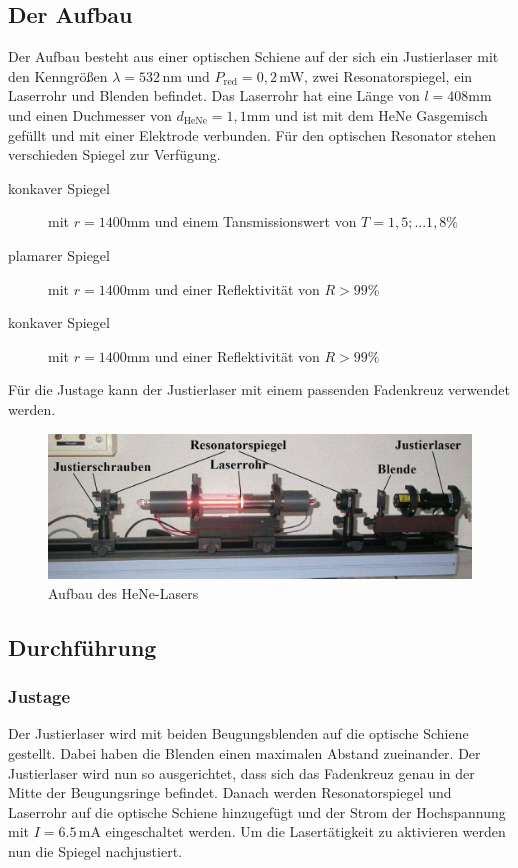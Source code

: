 \subsection{Der Aufbau}
Der Aufbau besteht aus einer optischen Schiene auf der sich ein Justierlaser mit den Kenngrößen $\lambda=532\,$nm und $P_{\text{red}}=0,2\,$mW, 
zwei Resonatorspiegel, ein Laserrohr und Blenden befindet. Das Laserrohr hat eine Länge von $l=408$mm und einen Duchmesser
von $d_{\text{HeNe}}=1,1$mm und ist mit dem HeNe Gasgemisch gefüllt und mit einer Elektrode verbunden.
Für den optischen Resonator stehen verschieden Spiegel zur Verfügung.
\begin{description}
    \item[konkaver Spiegel] mit $r=1400$mm und einem Tansmissionswert von $T=1,5;...1,8\%$
    \item[plamarer Spiegel] mit $r=1400$mm und einer Reflektivität von $R>99\%$
    \item[konkaver Spiegel] mit $r=1400$mm und einer Reflektivität von $R>99\%$
    \end{description}
Für die Justage kann der Justierlaser mit einem passenden Fadenkreuz verwendet werden.
\begin{figure}[H]
    \center
    \includegraphics[width=\textwidth]{bilder/laser.jpg}
    \caption{Aufbau des HeNe-Lasers \cite{anleitung}}
\end{figure}

\subsection{Durchführung}
\subsubsection{Justage}
Der Justierlaser wird mit beiden Beugungsblenden auf die optische Schiene gestellt. Dabei haben die Blenden
einen maximalen Abstand zueinander. Der Justierlaser wird nun so ausgerichtet, dass sich das Fadenkreuz genau in der Mitte der Beugungsringe
befindet. Danach werden Resonatorspiegel und Laserrohr auf die optische Schiene hinzugefügt und der Strom der Hochspannung mit $I=6.5\,$mA eingeschaltet werden.
Um die Lasertätigkeit zu aktivieren werden nun die Spiegel nachjustiert. 
